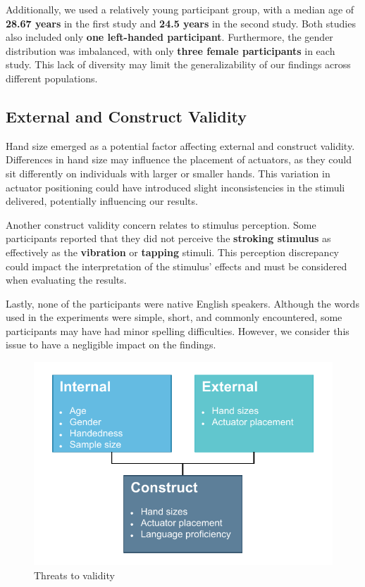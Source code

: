 Additionally, we used a relatively young participant group, with a median age of \textbf{28.67 years} in the first study and \textbf{24.5 years} in the second study. Both studies also included only \textbf{one left-handed participant}. Furthermore, the gender distribution was imbalanced, with only \textbf{three female participants} in each study. This lack of diversity may limit the generalizability of our findings across different populations.

\subsection{External and Construct Validity}
Hand size emerged as a potential factor affecting external and construct validity. Differences in hand size may influence the placement of actuators, as they could sit differently on individuals with larger or smaller hands. This variation in actuator positioning could have introduced slight inconsistencies in the stimuli delivered, potentially influencing our results.

Another construct validity concern relates to stimulus perception. Some participants reported that they did not perceive the \textbf{stroking stimulus} as effectively as the \textbf{vibration} or \textbf{tapping} stimuli. This perception discrepancy could impact the interpretation of the stimulus' effects and must be considered when evaluating the results.

Lastly, none of the participants were native English speakers. Although the words used in the experiments were simple, short, and commonly encountered, some participants may have had minor spelling difficulties. However, we consider this issue to have a negligible impact on the findings.

\begin{figure}
    \centering
    \includegraphics[width=0.5\linewidth]{src/pictures/StudyData/Threats_to_validity.drawio.pdf}
    \caption{Threats to validity}
    \label{fig:threats_to_validity}
\end{figure}




